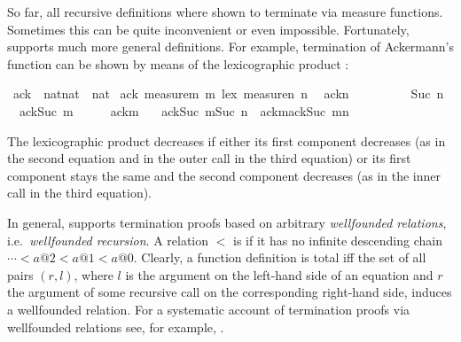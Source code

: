 %
\begin{isabellebody}%
\def\isabellecontext{WFrec}%
%
\begin{isamarkuptext}%
\noindent
So far, all recursive definitions where shown to terminate via measure
functions. Sometimes this can be quite inconvenient or even
impossible. Fortunately,  supports much more
general definitions. For example, termination of Ackermann's function
can be shown by means of the lexicographic product :%
\end{isamarkuptext}%
\ ack\ {\isacharcolon}{\isacharcolon}\ {\isachardoublequote}nat{\isasymtimes}nat\ {\isasymRightarrow}\ nat{\isachardoublequote}\isanewline
{}\ ack\ {\isachardoublequote}measure{\isacharparenleft}{\isasymlambda}m{\isachardot}\ m{\isacharparenright}\ {\isacharless}{\isacharasterisk}lex{\isacharasterisk}{\isachargreater}\ measure{\isacharparenleft}{\isasymlambda}n{\isachardot}\ n{\isacharparenright}{\isachardoublequote}\isanewline
\ \ {\isachardoublequote}ack{\isacharparenleft}{}{\isacharcomma}n{\isacharparenright}\ \ \ \ \ \ \ \ \ {\isacharequal}\ Suc\ n{\isachardoublequote}\isanewline
\ \ {\isachardoublequote}ack{\isacharparenleft}Suc\ m{\isacharcomma}{}{\isacharparenright}\ \ \ \ \ {\isacharequal}\ ack{\isacharparenleft}m{\isacharcomma}\ {}{\isacharparenright}{\isachardoublequote}\isanewline
\ \ {\isachardoublequote}ack{\isacharparenleft}Suc\ m{\isacharcomma}Suc\ n{\isacharparenright}\ {\isacharequal}\ ack{\isacharparenleft}m{\isacharcomma}ack{\isacharparenleft}Suc\ m{\isacharcomma}n{\isacharparenright}{\isacharparenright}{\isachardoublequote}%
\begin{isamarkuptext}%
\noindent
The lexicographic product decreases if either its first component
decreases (as in the second equation and in the outer call in the
third equation) or its first component stays the same and the second
component decreases (as in the inner call in the third equation).

In general,  supports termination proofs based on
arbitrary \emph{wellfounded relations}, i.e.\ \emph{wellfounded
recursion}.  A relation $<$ is
 if it has no infinite descending chain $\cdots <
a@2 < a@1 < a@0$. Clearly, a function definition is total iff the set
of all pairs $(r,l)$, where $l$ is the argument on the left-hand side of an equation
and $r$ the argument of some recursive call on the corresponding
right-hand side, induces a wellfounded relation.  For a systematic
account of termination proofs via wellfounded relations see, for
example, \cite{Baader-Nipkow}.


\end{isamarkuptext}
\end{isabellebody}
